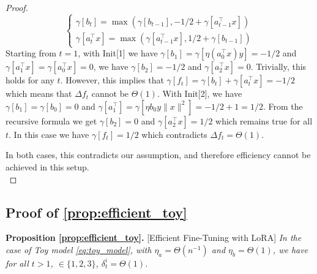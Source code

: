 \begin{proof}
\begin{equation*}
    \begin{cases}
        \gamma[b_t] = \max(\gamma[b_{t-1}], -1/2 + \gamma[a_{t-1}^\top x]) \\
        \gamma[a_t^\top x] = \max(\gamma[a_{t-1}^\top x], 1/2+\gamma[b_{t-1}]) 
    \end{cases}
\end{equation*}
Starting from $t=1$, with Init[1] we have $\gamma[b_1] = \gamma[\eta (a_0^\top x)y] = -1/2$ and $\gamma[a_1^\top x] = \gamma[a_0^\top x] = 0$, we have $\gamma[b_2] = -1/2$ and $\gamma[a_2^\top x] = 0$. Trivially, this holds for any $t$. However, this implies that $\gamma[f_t] = \gamma[b_t] + \gamma[a_{t}^\top x] = -1/2$ which means that $\Delta f_t$ cannot be $\Theta(1)$. With Init[2], we have $\gamma[b_1] = \gamma[b_0] = 0$ and $\gamma[a_1^\top] = \gamma[\eta b_0 y \|x\|^2] = -1/2+1 = 1/2$. From the recursive formula we get $\gamma[b_2] = 0$ and $\gamma[a_2^\top x] = 1/2$ which remains true for all $t$. In this case we have $\gamma[f_t] = 1/2$ which contradicts $\Delta f_t = \Theta(1)$.

In both cases, this contradicts our assumption, and therefore efficiency cannot be achieved in this setup.
\\

\end{proof}



\subsection{Proof of \texorpdfstring{\cref{prop:efficient_toy}}{Proposition Efficient Toy}}

\textbf{Proposition \ref{prop:efficient_toy}.} [Efficient Fine-Tuning with LoRA]
\emph{In the case of Toy model \cref{eq:toy_model}, with $\eta_a = \Theta(n^{-1})$ and $\eta_b = \Theta(1)$, we have for all $t>1$, $\in \{1,2,3\}$, $\delta_t^i = \Theta(1)$.}

